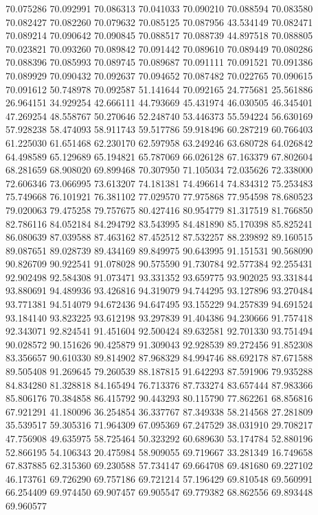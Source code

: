 70.075286
70.092991
70.086313
70.041033
70.090210
70.088594
70.083580
70.082427
70.082260
70.079632
70.085125
70.087956
43.534149
70.082471
70.089214
70.090642
70.090845
70.088517
70.088739
44.897518
70.088805
70.023821
70.093260
70.089842
70.091442
70.089610
70.089449
70.080286
70.088396
70.085993
70.089745
70.089687
70.091111
70.091521
70.091386
70.089929
70.090432
70.092637
70.094652
70.087482
70.022765
70.090615
70.091612
50.748978
70.092587
51.141644
70.092165
24.775681
25.561886
26.964151
34.929254
42.666111
44.793669
45.431974
46.030505
46.345401
47.269254
48.558767
50.270646
52.248740
53.446373
55.594224
56.630169
57.928238
58.474093
58.911743
59.517786
59.918496
60.287219
60.766403
61.225030
61.651468
62.230170
62.597958
63.249246
63.680728
64.026842
64.498589
65.129689
65.194821
65.787069
66.026128
67.163379
67.802604
68.281659
68.908020
69.899468
70.307950
71.105034
72.035626
72.338000
72.606346
73.066995
73.613207
74.181381
74.496614
74.834312
75.253483
75.749668
76.101921
76.381102
77.029570
77.975868
77.954598
78.680523
79.020063
79.475258
79.757675
80.427416
80.954779
81.317519
81.766850
82.786116
84.052184
84.294792
83.543995
84.481890
85.170398
85.825241
86.080639
87.039588
87.463162
87.452512
87.532257
88.239892
89.160515
89.087651
89.028739
89.434169
89.849975
90.643995
91.151531
90.568090
90.826709
90.922541
91.078028
90.575590
91.730784
92.577384
92.255431
92.902498
92.584308
91.073471
93.331352
93.659775
93.902025
93.331844
93.880691
94.489936
93.426816
94.319079
94.744295
93.127896
93.270484
93.771381
94.514079
94.672436
94.647495
93.155229
94.257839
94.691524
93.184140
93.823225
93.612198
93.297839
91.404386
94.230666
91.757418
92.343071
92.824541
91.451604
92.500424
89.632581
92.701330
93.751494
90.028572
90.151626
90.425879
91.309043
92.928539
89.272456
91.852308
83.356657
90.610330
89.814902
87.968329
84.994746
88.692178
87.671588
89.505408
91.269645
79.260539
88.187815
91.642293
87.591906
79.935288
84.834280
81.328818
84.165494
76.713376
87.733274
83.657444
87.983366
85.806176
70.384858
86.415792
90.443293
80.115790
77.862261
68.856816
67.921291
41.180096
36.254854
36.337767
87.349338
58.214568
27.281809
35.539517
59.305316
71.964309
67.095369
67.247529
38.031910
29.708217
47.756908
49.635975
58.725464
50.323292
60.689630
53.174784
52.880196
52.866195
54.106343
20.475984
58.909055
69.719667
33.281349
16.749658
67.837885
62.315360
69.230588
57.734147
69.664708
69.481680
69.227102
46.173761
69.726290
69.757186
69.721214
57.196429
69.810548
69.560991
66.254409
69.974450
69.907457
69.905547
69.779382
68.862556
69.893448
69.960577
